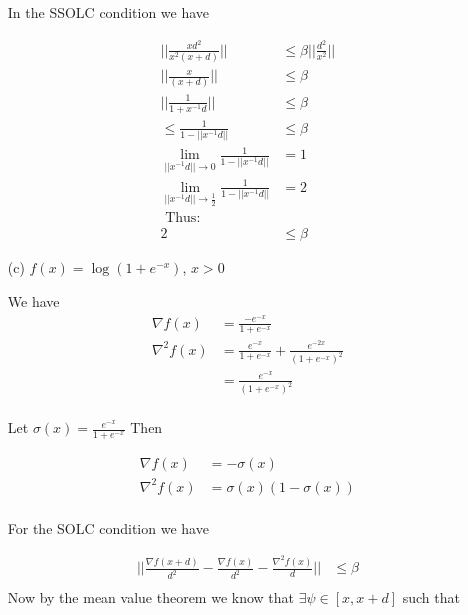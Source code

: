 \documentclass[answers]{exam} %
\begin{document}
\begin{itemize}
\begin{framed}
In the SSOLC condition we have

\begin{equation*}
\begin{aligned}
|| \frac{ x d^2}{x^2(x +d)} || &\leq \beta || \frac{d^2}{x^2} || \\ 
|| \frac{ x }{(x +d)} || &\leq \beta  \\ 
|| \frac{ 1}{1 + x^{-1} d} || &\leq \beta  \\ 
\leq \frac{1}{ 1 - || x^{-1} d|| }&\leq \beta  \\ 
\lim_{|| x^{-1} d|| \to 0 } \frac{1}{ 1 - || x^{-1} d|| } &= 1\\
\lim_{|| x^{-1} d|| \to \frac{1}{2} } \frac{1}{ 1 - || x^{-1} d|| } &= 2 \\ 
\mbox{ Thus: } & \\ 
2 &\leq \beta 
\end{aligned}
\end{equation*}








\end{framed}
\item[(c)] $f(x)=\log(1+e^{-x})$, $x> 0$
\begin{framed}

We have 
\begin{equation*}
\begin{aligned}
\nabla f(x) &= \frac{-e^{-x}}{1 + e^{-x}} \\
\nabla^2 f(x) &= \frac{e^{-x}}{1 + e^{-x}} + \frac{e^{-2x}}{ (1 + e^{-x})^2} \\ 
&= \frac{e^{-x}}{(1 + e^{-x})^2} \\ 
\end{aligned}
\end{equation*}

Let $\sigma(x) = \frac{e^{-x}}{1 + e^{-x}}$ Then 

\begin{equation*}
\begin{aligned}
\nabla f(x) &= - \sigma(x) \\
\nabla^2 f(x) &= \sigma(x) (1 - \sigma(x)) \\
\end{aligned}
\end{equation*}

For the SOLC condition we have


\begin{equation*}
\begin{aligned}
|| \frac{\nabla f(x+ d)}{d^2} - \frac{\nabla f(x)}{d^2} - \frac{\nabla^2 f(x)}{d} || &\leq \beta \\ 
\end{aligned}
\end{equation*}
Now by the mean value theorem we know that  $\exists  \psi \in [x, x + d]$ such that 


\end{framed}
\end{itemize}
\end{document}
